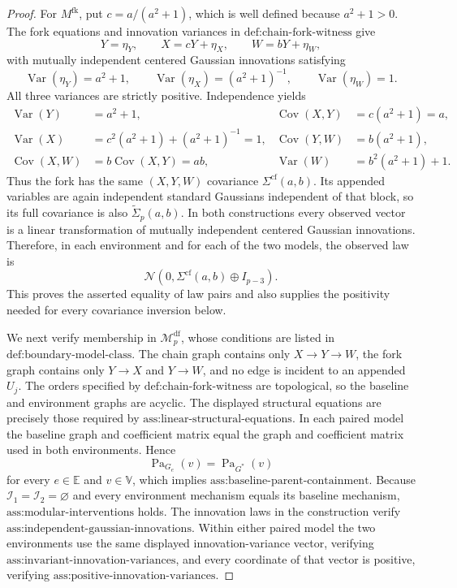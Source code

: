 \documentclass{article}
\begin{document}
\begin{proof}
For \(M^{\mathrm{fk}}\), put \(c=a/(a^2+1)\), which is well defined because \(a^2+1>0\). The fork equations and innovation variances in \(\text{def:chain-fork-witness}\) give
\[
Y=\eta_Y,\qquad X=cY+\eta_X,
\qquad W=bY+\eta_W,
\]
with mutually independent centered Gaussian innovations satisfying
\[
 \operatorname{Var}(\eta_Y)=a^2+1,
 \qquad \operatorname{Var}(\eta_X)=(a^2+1)^{-1},
 \qquad \operatorname{Var}(\eta_W)=1.
\]
All three variances are strictly positive. Independence yields
\[
\begin{aligned}
 \operatorname{Var}(Y)&=a^2+1,
 &\operatorname{Cov}(X,Y)&=c(a^2+1)=a,\\
 \operatorname{Var}(X)&=c^2(a^2+1)+(a^2+1)^{-1}=1,
 &\operatorname{Cov}(Y,W)&=b(a^2+1),\\
 \operatorname{Cov}(X,W)&=b\operatorname{Cov}(X,Y)=ab,
 &\operatorname{Var}(W)&=b^2(a^2+1)+1.
\end{aligned}
\]
Thus the fork has the same \((X,Y,W)\) covariance \(\Sigma^{\mathrm{cf}}(a,b)\). Its appended variables are again independent standard Gaussians independent of that block, so its full covariance is also \(\widetilde\Sigma_p(a,b)\). In both constructions every observed vector is a linear transformation of mutually independent centered Gaussian innovations. Therefore, in each environment and for each of the two models, the observed law is
\[
 \mathcal N\!\left(0,\Sigma^{\mathrm{cf}}(a,b)\oplus I_{p-3}\right).
\]
This proves the asserted equality of law pairs and also supplies the positivity needed for every covariance inversion below.

We next verify membership in \(\mathcal M_p^{\mathrm{df}}\), whose conditions are listed in \(\text{def:boundary-model-class}\). The chain graph contains only \(X\to Y\to W\), the fork graph contains only \(Y\to X\) and \(Y\to W\), and no edge is incident to an appended \(U_j\). The orders specified by \(\text{def:chain-fork-witness}\) are topological, so the baseline and environment graphs are acyclic. The displayed structural equations are precisely those required by \(\text{ass:linear-structural-equations}\). In each paired model the baseline graph and coefficient matrix equal the graph and coefficient matrix used in both environments. Hence
\[
 \operatorname{Pa}_{G_e}(v)=\operatorname{Pa}_{G^*}(v)
\]
for every \(e\in\mathbb E\) and \(v\in\mathbb V\), which implies \(\text{ass:baseline-parent-containment}\). Because \(\mathcal I_1=\mathcal I_2=\varnothing\) and every environment mechanism equals its baseline mechanism, \(\text{ass:modular-interventions}\) holds. The innovation laws in the construction verify \(\text{ass:independent-gaussian-innovations}\). Within either paired model the two environments use the same displayed innovation-variance vector, verifying \(\text{ass:invariant-innovation-variances}\), and every coordinate of that vector is positive, verifying \(\text{ass:positive-innovation-variances}\).


\end{proof}
\end{document}
